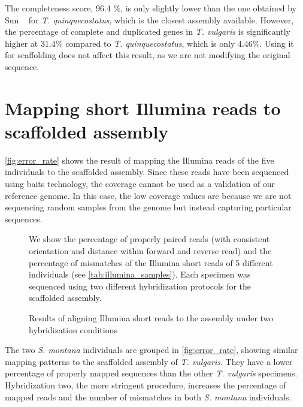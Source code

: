 The completeness score, 96.4 \%, is only slightly lower than the one obtained by Sun \etal~\cite{sunChromosomelevelAssemblyAnalysis2022} for \textit{T. quinquecostatus}, which is the closest assembly available. However, the percentage of complete and duplicated genes in \textit{T. vulgaris} is significantly higher at 31.4\% compared to \textit{T. quinquecostatus}, which is only 4.46\%. Using it for scaffolding does not affect this result, as we are not modifying the original sequence.\\


\section*{Mapping short Illumina reads to scaffolded assembly}

\autoref{fig:error_rate} shows the result of mapping the Illumina reads of the five individuals to the scaffolded assembly. Since these reads have been sequenced using baits technology, the coverage cannot be used as a validation of our reference genome. In this case, the low coverage values are because we are not sequencing random samples from the genome but instead capturing particular sequences.\\


\begin{figure}
    \begin{center}
        \def\svgwidth{\textwidth}
        
        \caption{Results of aligning Illumina short reads to the assembly under two hybridization conditions}            
        \label{fig:error_rate}
    \end{center}
    \footnotesize
    We show the percentage of properly paired reads (with consistent orientation and distance within forward and reverse read) and the percentage of mismatches of the Illumina short reads of 5 different individuals (see \autoref{tab:illumina_samples}). Each specimen was sequenced using two different hybridization protocols for the scaffolded assembly.     
\end{figure}  

The two \textit{S. montana} individuals are grouped in \autoref{fig:error_rate}, showing similar mapping patterns to the scaffolded assembly of \textit{T. vulgaris}. They have a lower percentage of properly mapped sequences than the other \textit{T. vulgaris} specimens. Hybridization two, the more stringent procedure, increases the percentage of mapped reads and the number of mismatches in both \textit{S. montana} individuals.\\

